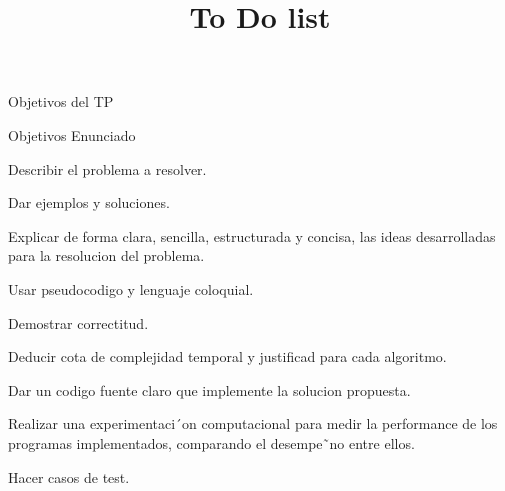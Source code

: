 \documentclass{article}
\begin{document}
\title{To Do list}
\date{}
\maketitle

Objetivos del TP

\begin{itemize}
  \item Objetivos Enunciado 

  \begin{todolist}
    \item Describir el problema a resolver.
    \begin{todolist}
      \item Dar ejemplos y soluciones.
    \end{todolist}
    \item Explicar de forma clara, sencilla, estructurada y concisa, las ideas desarrolladas para la resolucion del problema. 
    \begin{todolist}
      \item Usar pseudocodigo y lenguaje coloquial.
      \item Demostrar correctitud.
    \end{todolist}
    \item Deducir cota de complejidad temporal y justificad para cada algoritmo.
    \item Dar un codigo fuente claro que implemente la solucion propuesta.
    \item Realizar una experimentaci´on computacional para medir la performance de los programas implementados, comparando el desempe˜no entre ellos.
    \begin{todolist}
      \item Hacer casos de test.
    \end{todolist}
    
  \end{todolist}

\end{itemize}
\end{document}
